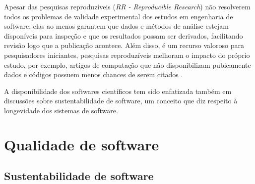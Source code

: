 Apesar das pesquisas reproduzíveis ({\it RR - Reproducible Research}) não
resolverem todos os problemas de validade experimental dos estudos em
engenharia de software, elas ao menos garantem que dados e métodos de análise
estejam disponíveis para inspeção e que os resultados possam ser derivados,
facilitando revisão logo que a publicação acontece. Além disso, é um recurso
valoroso para pesquisadores iniciantes, pesquisas reproduzíveis melhoram o
impacto do próprio estudo, por exemplo, artigos de computação que não
disponibilizam pubicamente dados e códigos possuem menos chances de serem
citados \cite{madeyski2017would}.

A disponibilidade dos softwares científicos tem sido enfatizada também em
discussões sobre sustentabilidade de software, um conceito que diz respeito
à longevidade dos sistemas de software.




\section{Qualidade de software}

\subsection{Sustentabilidade de software} \label{sustentabilidade}


